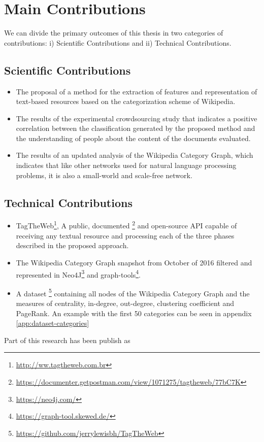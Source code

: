 \section{\hspace*{3pt}Main Contributions}

We can divide the primary outcomes of this thesis in two categories of contributions: i) Scientific Contributions and ii) Technical Contributions.

\subsection{\hspace*{3pt}Scientific Contributions}


\begin{itemize}
\item The proposal of a method for the extraction of features and representation of text-based resources based on the categorization scheme of Wikipedia.

\item The results of the experimental crowdsourcing study that indicates a positive correlation between the classification generated by the proposed method and the understanding of people about the content of the documents evaluated.

\item The results of an updated analysis of the Wikipedia Category Graph, which indicates that like other networks used for natural language processing problems, it is also a small-world and scale-free network.


\end{itemize}


\subsection{\hspace*{3pt}Technical Contributions}

\begin{itemize}
\item TagTheWeb\footnote{\url{http://ww.tagtheweb.com.br}}, A public, documented \footnote {\url {https://documenter.getpostman.com/view/1071275/tagtheweb/77bC7K}} and open-source API capable of receiving any textual resource and processing each of the three phases described in the proposed approach.

\item 
The Wikipedia Category Graph snapshot from October of 2016 filtered and represented in Neo4J\footnote{\url{https://neo4j.com/}} and graph-tools\footnote{\url{https://graph-tool.skewed.de/}}.  

\item A dataset \footnote {\url {https://github.com/jerrylewisbh/TagTheWeb}} containing all nodes of the Wikipedia Category Graph and the measures of centrality, in-degree, out-degree, clustering coefficient and PageRank. An example with the first 50 categories can be seen in appendix \ref{app:dataset-categories}

\end{itemize}
Part of this research has been publish as \\


